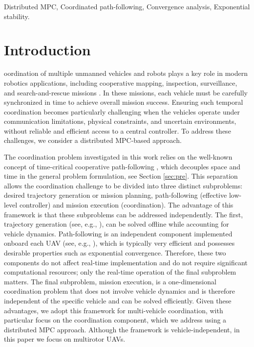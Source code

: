 \documentclass[letterpaper,journal]{IEEEtran}
\begin{document}
\begin{IEEEkeywords}Distributed MPC, Coordinated path-following, Convergence analysis, Exponential stability.

\end{IEEEkeywords}

\section{Introduction}
oordination of multiple unmanned vehicles and robots plays a key role in modern robotics applications, including cooperative mapping, inspection, surveillance, and search-and-rescue missions \cite{olfati2007consensus, cao2013overview}. 
In these missions, each vehicle must be carefully synchronized in time to achieve overall mission success. Ensuring such temporal coordination becomes particularly challenging when the vehicles operate under communication limitations, physical constraints, and uncertain environments, without reliable and efficient access to a central controller. To address these challenges, we consider a distributed MPC-based approach.

The coordination problem investigated in this work relies on the well-known concept of time-critical cooperative path-following \cite{time-clock,5160564,7065327,kaminer2017time}, which decouples space and time in the general problem formulation, see Section \ref{sec:pre}. This separation allows the coordination challenge to be divided into three distinct subproblems: desired trajectory generation or mission planning,  path-following (effective low-level controller) and  mission execution (coordination). The advantage of this framework is that these subproblems can be addressed independently. The first, trajectory generation (see, e.g., \cite{Dubins1957OnCO, 5980409}), can be solved offline while accounting for vehicle dynamics. Path-following is an independent component implemented onboard each UAV (see, e.g., \cite{5717652, 7963104}), which is typically very efficient and possesses desirable properties such as exponential convergence. Therefore, these two components do not affect real-time implementation and do not require significant computational resources; only the real-time operation of the final subproblem matters. The final subproblem, mission execution, is a one-dimensional coordination problem that does not involve vehicle dynamics and is therefore independent of the specific vehicle and can be solved efficiently. Given these advantages, we adopt this framework for multi-vehicle coordination, with particular focus on the coordination component, which we address using a distributed MPC approach. Although the framework is vehicle-independent, in this paper we focus on multirotor UAVs.
\end{document}
